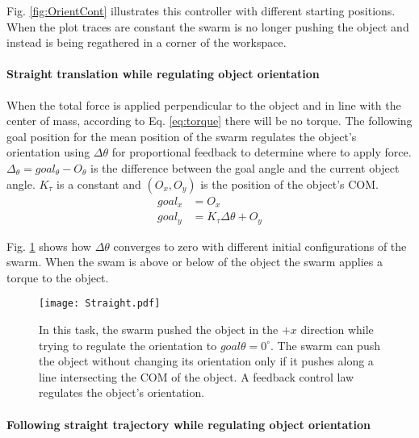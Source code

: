 Fig. \ref{fig:OrientCont} illustrates this controller with different starting positions. When the plot traces are constant the swarm is no longer pushing the object and instead is being regathered in a corner of the workspace. 

\paragraph{Straight translation while regulating object orientation} \label{para:PureTranslation}

When the total force is applied perpendicular to the object and in line with the center of mass, according to Eq. \ref{eq:torque} there will be no torque. 
The following goal position for the mean position of the swarm regulates the object's orientation using $\Delta \theta$ for proportional feedback  to determine where to apply force.
$\Delta_\theta = goal_\theta - O_\theta$ is the difference between the goal angle and the current object angle.
 $K_\tau$ is a constant and $(O_x,O_y)$ is the position of the object's COM.
\begin{align}
goal_x &= O_x \nonumber \\
goal_y &= K_\tau \Delta\theta + O_y  \label{eq:TranslationAndOrientation}
\end{align}

 Fig. \ref{fig:Straight} shows how $\Delta \theta$ converges to zero with different initial configurations of the swarm. When the swam is above or below of the object the swarm applies a torque to the object.
 
 
\begin{figure}
\begin{center}
	\texttt{[image: Straight.pdf]}
\end{center}
\vspace{-1em}
\caption{\label{fig:Straight}
In this task, the swarm pushed the object in the $+x$ direction while trying to regulate the orientation to $goal\theta = 0^\circ$.
 The swarm can push the object without changing its orientation only if it pushes along a line intersecting the COM of the object.  A feedback control law regulates the object's orientation.
}
\vspace{-1em}
\end{figure}

\paragraph{Following straight trajectory while regulating object orientation} \label{para:PureTranslation}

